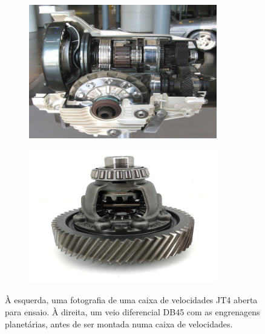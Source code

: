 \begin{figure}[htb]
    \centering
    \begin{subfigure}{.5\textwidth}
        \centering
        \includegraphics[width = 0.9\textwidth]{Figures/Cap2/Caixa_de_velocidades.png}
        \caption{}
        \label{fig:caixa_de_velocidades}
    \end{subfigure}%
    \begin{subfigure}{.5\textwidth}
        \centering
        \includegraphics[width = 0.9\textwidth]{Figures/Cap2/Caixa_diferencial.png}
        \caption{}
        \label{fig:diferencial_montado}
    \end{subfigure}
\caption[Uma caixa de velocidades e uma caixa diferencial]%
{À esquerda, uma fotografia de uma caixa de velocidades JT4 aberta para ensaio. À direita, um veio diferencial DB45 com as engrenagens planetárias, antes de ser montada numa caixa de velocidades.}
\end{figure}
